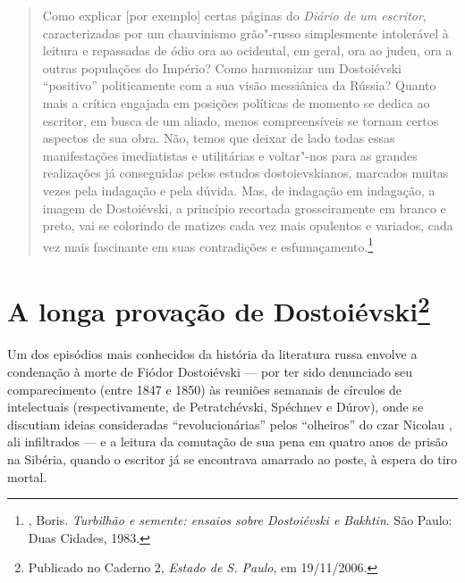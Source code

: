 \begin{quotation}
Como explicar [por exemplo] certas páginas do \emph{Diário de um escritor}, caracterizadas por um chauvinismo grão"-russo simplesmente intolerável à leitura e repassadas de ódio ora ao ocidental, em geral, ora ao judeu, ora a outras populações do Império? Como harmonizar um Dostoiévski ``positivo'' politicamente com a sua visão messiânica da Rússia? Quanto mais a crítica engajada em posições políticas de momento se dedica ao escritor, em busca de um aliado, menos compreensíveis se tornam certos aspectos de sua obra. Não, temos que deixar de lado todas essas manifestações imediatistas e utilitárias e voltar"-nos para as grandes realizações já conseguidas pelos estudos dostoievskianos, marcados muitas vezes pela indagação e pela dúvida. Mas, de indagação em indagação, a imagem de Dostoiévski, a princípio recortada grosseiramente em branco e preto, vai se colorindo de matizes cada vez mais opulentos e variados, cada vez mais fascinante em suas contradições e esfumaçamento.\footnote{, Boris. \emph{Turbilhão e semente: ensaios sobre Dostoiévski e Bakhtin}. São Paulo: Duas Cidades, 1983.}
\end{quotation}



\chapter*{A longa provação de Dostoiévski\footnote{Publicado no Caderno 2, \emph{Estado de S. Paulo}, em 19/11/2006.}}



Um dos episódios mais conhecidos da história da literatura russa envolve a
condenação à morte de Fiódor Dostoiévski --- por ter sido
denunciado seu comparecimento (entre 1847 e 1850) às reuniões
semanais de círculos de intelectuais (respectivamente, de
Petratchévski, Spéchnev e Dúrov), onde se discutiam ideias
consideradas ``revolucionárias'' pelos ``olheiros'' do czar
Nicolau , ali infiltrados --- e a leitura da
comutação de sua pena em quatro anos de prisão na Sibéria,
quando o escritor já se encontrava amarrado ao poste,
à espera do tiro mortal.

